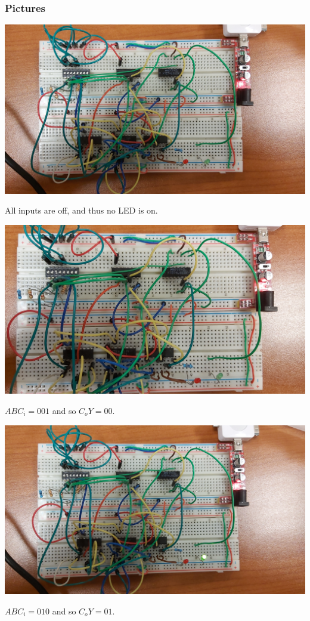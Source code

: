 \documentclass{article}
\begin{document}
\newpage

\subsubsection{Pictures}


\includegraphics[width=\textwidth]{./figures/00000.jpg}
\begin{center}
	All inputs are off, and thus no LED is on.
\end{center}

\vspace{2em}

\includegraphics[width=\textwidth]{./figures/00100.jpg}
\begin{center}
	$ABC_i = 001$ and so $C_o Y= 00$.\\
\end{center}


\includegraphics[width=\textwidth]{./figures/01000.jpg}
\begin{center}
	$ABC_i = 010$ and so $C_o Y= 01$.
\end{center}
\end{document}
